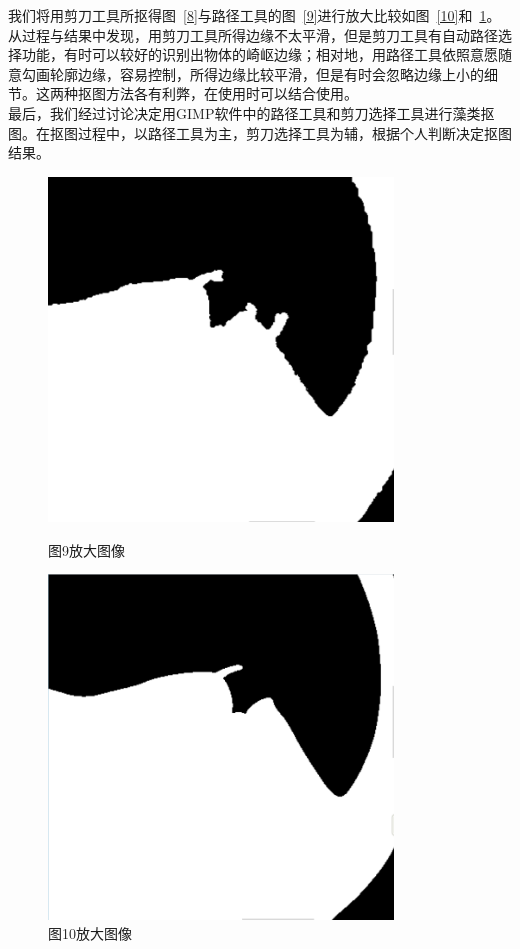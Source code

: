 \documentclass[12pt]{article}
\begin{document}
我们将用剪刀工具所抠得图~\ref{8}与路径工具的图~\ref{9}进行放大比较如图~\ref{10}和~\ref{11}。从过程与结果中发现，用剪刀工具所得边缘不太平滑，但是剪刀工具有自动路径选择功能，有时可以较好的识别出物体的崎岖边缘；相对地，用路径工具依照意愿随意勾画轮廓边缘，容易控制，所得边缘比较平滑，但是有时会忽略边缘上小的细节。这两种抠图方法各有利弊，在使用时可以结合使用。\\

最后，我们经过讨论决定用GIMP软件中的路径工具和剪刀选择工具进行藻类抠图。在抠图过程中，以路径工具为主，剪刀选择工具为辅，根据个人判断决定抠图结果。

\begin{figure}[htbp]
\begin{minipage}{0.5\textwidth}
\centering
\includegraphics[width=3.6in]{jian.png}
\caption{图9放大图像}
\label{10}
\end{minipage}
\begin{minipage}{0.5\textwidth}
\centering
\includegraphics[width=3.6in]{gang.png}
\caption{图10放大图像}
\label{11}
\end{minipage}
\end{figure}

\end{document}
